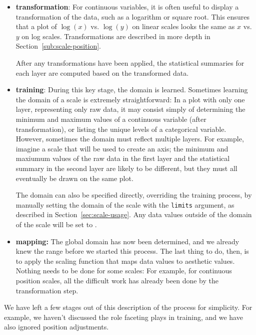 \begin{itemize}

  \item {\bf transformation}: For continuous variables, it is often useful to display a transformation of the data, such as a logarithm or square root.  This ensures that a plot of $\log(x)$ vs. $\log(y)$ on linear scales looks the same as $x$ vs. $y$ on log scales.  Transformations are described in more depth in Section~\ref{sub:scale-position}.

  After any transformations have been applied, the statistical summaries for each layer are computed based on the transformed data.

  \item {\bf training}:  During this key stage, the domain is learned.  Sometimes learning the domain of a scale is extremely straightforward: In a plot with only one layer, representing only raw data, it may consist simply of determining the minimum and maximum values of a continuous variable (after transformation), or listing the unique levels of a categorical variable.  However, sometimes the domain must reflect multiple layers.  For example, imagine a scale that will be used to create an axis; the minimum and maxiumum values of the raw data in the first layer and the statistical summary in the second layer are likely to be different, but they must all eventually be drawn on the same plot.

  The domain can also be specified directly, overriding the training process, by manually setting the domain of the scale with the {\tt limits} argument, as described in Section~\ref{sec:scale-usage}.  Any data values outside of the domain of the scale will be set to .

  \item {\bf mapping:}  The global domain has now been determined, and we already knew the range before we started this process.  The last thing to do, then, is to apply the scaling function that maps data values to aesthetic values.  Nothing needs to be done for some scales: For example, for continuous position scales, all the difficult work has already been done by the transformation step.

\end{itemize}

We have left a few stages out of this description of the process for simplicity.  For example, we haven't discussed the role faceting plays in training, and we have also ignored position adjustments.

